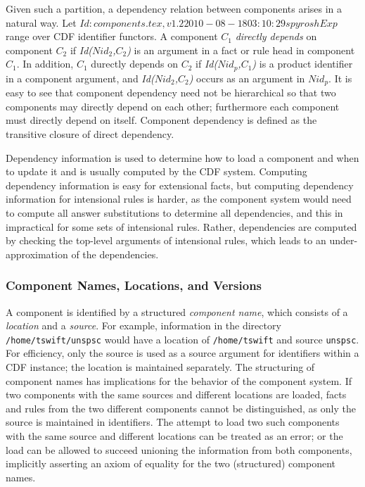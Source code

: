 Given such a partition, a dependency relation between components
arises in a natural way.  Let $Id: components.tex,v 1.2 2010-08-18 03:10:29 spyrosh Exp $ range over CDF identifier functors.
A component $C_1$ {\em directly depends} on component $C_2$ if {\em
Id($Nid_2$,$C_2$)} is an argument in a fact or rule head in component
$C_1$.  In addition, $C_1$ durectly depends on $C_2$ if {\em
Id($Nid_p$,$C_1$)} is a product identifier in a component argument,
and {\em Id($Nid_2$,$C_2$)} occurs as an argument in $Nid_p$.  It is
easy to see that component dependency need not be hierarchical so that
two components may directly depend on each other; furthermore each
component must directly depend on itself.  Component dependency is
defined as the transitive closure of direct dependency.

Dependency information is used to determine how to load a component
and when to update it and is usually computed by the CDF system.
Computing dependency information is easy for extensional facts, but
computing dependency information for intensional rules is harder, as
the component system would need to compute all answer substitutions to
determine all dependencies, and this in impractical for some sets of
intensional rules.  Rather, dependencies are computed by checking the
top-level arguments of intensional rules, which leads to an
under-approximation of the dependencies.

\subsubsection{Component Names, Locations, and Versions}

A component is identified by a structured {\em component name}, which
consists of a {\em location} and a {\em source}.  For example,
information in the directory {\tt /home/tswift/unspsc} would have a
location of {\tt /home/tswift} and source {\tt unspsc}.  For
efficiency, only the source is used as a source argument for
identifiers within a CDF instance; the location is maintained
separately.  The structuring of component names has implications for
the behavior of the component system.  If two components with the same
sources and different locations are loaded, facts and rules from the
two different components cannot be distinguished, as only the source
is maintained in identifiers.  The attempt to load two such components
with the same source and different locations can be treated as an
error; or the load can be allowed to succeed unioning the information
from both components, implicitly asserting an axiom of equality for
the two (structured) component names.

